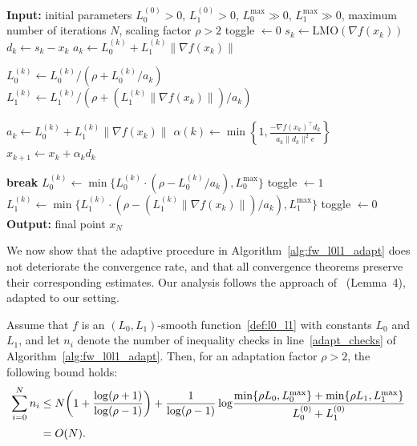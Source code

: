 \documentclass[runningheads]{llncs}
\begin{document}
	\begin{algorithm}
		\caption{Adaptive $(L_0, L_1)$-Frank-Wolfe Algorithm (Adapt $(L_0,L_1)$-FW)}
		\label{alg:fw_l0l1_adapt}
		\begin{algorithmic}[1]
			\State \textbf{Input:} initial parameters $L_0^{(0)} > 0$, $L_1^{(0)} > 0$, $L_0^{\max} \gg 0$, $L_1^{\max} \gg 0$, maximum number of iterations $N$, scaling factor $\rho > 2$
			\State toggle $\gets 0$
			\State $s_k \gets \mathrm{LMO}(\nabla f(x_k))$
			\State $d_k \gets s_k - x_k$
			\State $a_k \gets L_0^{(k)} + L_1^{(k)} \|\nabla f(x_k)\|$
			
			\State $L_0^{(k)} \gets L_0^{(k)} / (\rho + L_0^{(k)} / a_k)$ \label{divide_parameter_l0}
			\State $L_1^{(k)} \gets L_1^{(k)} / (\rho + (L_1^{(k)} \|\nabla f(x_k)\|) / a_k)$ \label{divide_parameter_l1}
			
			\State $a_k \gets L_0^{(k)} + L_1^{(k)} \|\nabla f(x_k)\|$
			\State $\displaystyle 
			\alpha(k) \gets \min \left\{ 1, 
			\frac{- \nabla f(x_k)^\top d_k}{a_k \|d_k\|^2 e} \right\}$
			\State $x_{k+1} \gets x_k + \alpha_k d_k$
			
			 \label{adapt_checks}
			\State \textbf{break}
			\Else
			\State $L_0^{(k)} \gets \min\{L_0^{(k)} \cdot (\rho - L_0^{(k)} / a_k), L_0^{\max}\}$ \label{multiply_parameter_l0}
			\State toggle $\gets 1$
			\Else
			\State $L_1^{(k)} \gets \min\{L_1^{(k)} \cdot (\rho - (L_1^{(k)} \|\nabla f(x_k)\|) / a_k), L_1^{\max}\}$ \label{multiply_parameter_l1}
			\State toggle $\gets 0$
			\EndIf
			\EndIf
			\EndWhile
			\EndFor
			\State \textbf{Output:} final point $x_N$
		\end{algorithmic}
	\end{algorithm}
	
	We now show that the adaptive procedure in Algorithm~\ref{alg:fw_l0l1_adapt} does not deteriorate the convergence rate, and that all convergence theorems preserve their corresponding estimates.  
	Our analysis follows the approach of~\cite{nesterov2013gradient} (Lemma~4), adapted to our setting.
	
	\begin{lemma}
		Assume that $f$ is an $(L_0,L_1)$-smooth function~\ref{def:l0_l1} with constants $L_0$ and $L_1$, and let $n_i$ denote the number of inequality checks in line~\ref{adapt_checks} of Algorithm~\ref{alg:fw_l0l1_adapt}.  
		Then, for an adaptation factor $\rho > 2$, the following bound holds:
		\begin{align}
			\sum_{i = 0}^{N} n_i  & \le 
			N \!\left(1 + \frac{\log(\rho + 1)}{\log(\rho - 1)}\right)
			+ \frac{1}{\log(\rho - 1)} 
			\log\!\frac{\min \{\rho L_0, L_0^{\max}\}  + \min \{\rho L_1, L_1^{\max}\} }{L_0^{(0)} + L_1^{(0)}} \notag \\[2pt]
			&= O(N).
		\end{align}
	\end{lemma}
	
\end{document}
